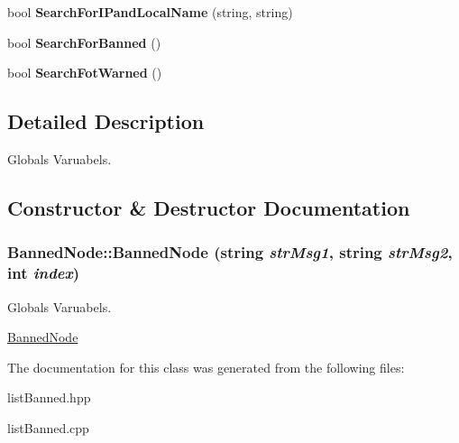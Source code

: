 \begin{DoxyCompactItemize}
\item 
\hypertarget{classBannedNode_a02f6ce2c74f774359edd16ccc0da6576}{
bool {\bfseries SearchForIPandLocalName} (string, string)}
\label{classBannedNode_a02f6ce2c74f774359edd16ccc0da6576}

\item 
\hypertarget{classBannedNode_a51189d33b8dc5766a8063d399e552c34}{
bool {\bfseries SearchForBanned} ()}
\label{classBannedNode_a51189d33b8dc5766a8063d399e552c34}

\item 
\hypertarget{classBannedNode_a478ab0aaf7122e4124b99df0df445f64}{
bool {\bfseries SearchFotWarned} ()}
\label{classBannedNode_a478ab0aaf7122e4124b99df0df445f64}

\end{DoxyCompactItemize}


\subsection{Detailed Description}
Globals Varuabels. 

\subsection{Constructor \& Destructor Documentation}
\hypertarget{classBannedNode_a7554d4749594dc5b3dc26dbc32c7aba4}{
\subsubsection[{BannedNode}]{\setlength{\rightskip}{0pt plus 5cm}BannedNode::BannedNode (string {\em strMsg1}, \/  string {\em strMsg2}, \/  int {\em index})}}
\label{classBannedNode_a7554d4749594dc5b3dc26dbc32c7aba4}


Globals Varuabels. 

\hyperlink{classBannedNode}{BannedNode} 

The documentation for this class was generated from the following files:\begin{DoxyCompactItemize}
\item 
listBanned.hpp\item 
listBanned.cpp\end{DoxyCompactItemize}
